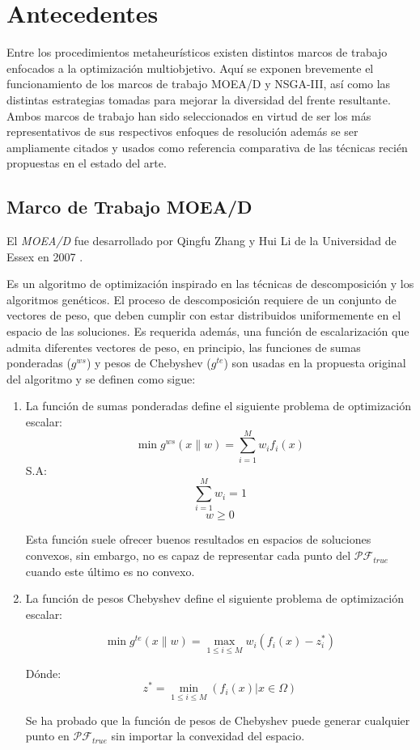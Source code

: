 \documentclass[letterpaper,10pt]{article}
\begin{document}
\section{Antecedentes}

Entre los procedimientos metaheurísticos existen distintos marcos de trabajo enfocados a la optimización multiobjetivo.
Aquí se exponen brevemente el funcionamiento de los marcos de trabajo MOEA/D y NSGA-III, así como las distintas estrategias tomadas para mejorar la diversidad del frente resultante.
Ambos marcos de trabajo han sido seleccionados en virtud de ser los más representativos de sus respectivos enfoques de resolución además se ser ampliamente citados y usados como 
referencia comparativa de las técnicas recién propuestas en el estado del arte.

\subsection{Marco de Trabajo MOEA/D}
El \emph{MOEA/D} fue desarrollado por Qingfu Zhang y Hui Li de la Universidad de Essex en 2007 \cite{4358754}.

Es un algoritmo de optimización inspirado en las técnicas de descomposición y los algoritmos genéticos. El proceso de descomposición requiere de un conjunto de vectores de peso,
que deben cumplir con estar distribuidos uniformemente en el espacio de las soluciones. Es requerida además, una función de escalarización que admita diferentes vectores de peso, en principio,
las funciones de sumas ponderadas  ($g^{ws}$) y pesos de Chebyshev ($g^{te}$) son usadas en la propuesta original del algoritmo y se definen como sigue:

\begin{enumerate}
\item La función de sumas ponderadas define el siguiente problema de optimización escalar:
$$\min g^{ws}(x\|w) = \sum^M_{i=1} w_if_i(x) $$
S.A:
$$ \sum^M_{i=1} w_i = 1$$
$$w \geq 0$$

Esta función suele ofrecer buenos resultados en espacios de soluciones convexos, sin embargo, no es capaz de representar cada punto del $\mathcal{PF}_{true}$ cuando este último es no convexo.

\item La función de pesos Chebyshev define el siguiente problema de optimización escalar:

$$\min g^{te}(x\|w) = \max_{1\leq i \leq M} w_i(f_i(x) -z_i^{*})$$

Dónde:
$$z^{*}= \min_{1\leq i \leq M} (f_i(x) | x \in \Omega) $$

Se ha probado que la función de pesos de Chebyshev puede generar cualquier punto en $\mathcal{PF}_{true}$ sin importar la convexidad del espacio.
\end{enumerate}
\end{document}
